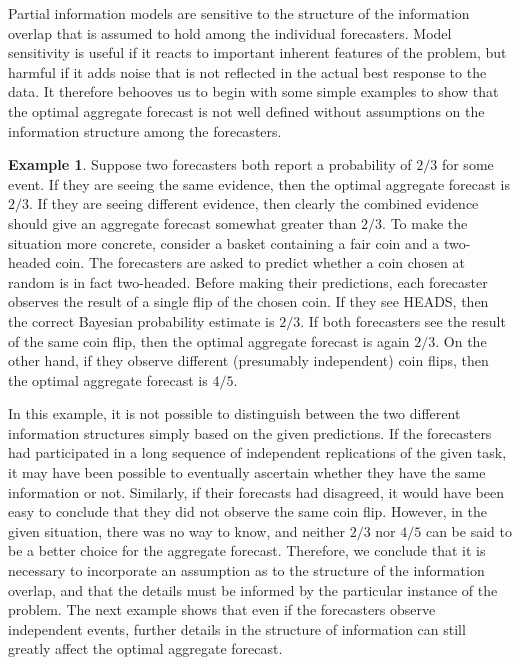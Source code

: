 \documentclass[11pt]{article}
\theoremstyle{definition}
\newtheorem{example}[theorem]{Example}
\theoremstyle{definition}
\begin{document}
Partial information models are sensitive to the structure of the
information overlap that is assumed to hold among the individual
forecasters. Model sensitivity is useful if it reacts
to important inherent features of the problem, but harmful if it adds
noise that is not reflected in the actual best response to the data.
It therefore behooves us to begin with some simple examples to show
that the optimal aggregate forecast is not well defined without
assumptions on the information structure among the forecasters.

\begin{example}
\label{FirstExample}
Suppose two forecasters both report a probability of $2/3$ for some
event.  If they are seeing the same evidence, then the optimal aggregate
forecast is $2/3$.  If they are seeing different evidence,
then clearly the combined evidence should give an aggregate forecast
somewhat greater than $2/3$.  To make the situation more concrete, consider a basket containing a fair coin and a two-headed coin. The forecasters are asked to predict whether a coin chosen at random is in fact
two-headed. Before making their predictions, each forecaster observes the result of a single flip of
the chosen coin.  If they see HEADS, then the correct
Bayesian probability estimate is $2/3$.  If both forecasters see the
result of the same coin flip, then the optimal aggregate forecast
 is again $2/3$. On the other hand, if they observe different (presumably
independent) coin flips, then the optimal aggregate forecast 
is $4/5$.
\end{example}
In this example, it is not possible to distinguish between the two different information structures simply based on the given predictions. If the forecasters had participated in a long sequence of independent replications of the given task, it may have been possible to eventually ascertain whether they have the same information or not. Similarly, if their forecasts had disagreed, it would have been easy to conclude that they did not observe the same coin flip.  However, in the given situation, there
was no way to know, and neither $2/3$ nor $4/5$ can be said to be a
better choice for the aggregate forecast.  Therefore, we conclude that it is necessary to incorporate an assumption as to the structure of the information
overlap, and that the details must be informed by the particular
instance of the problem. The next example shows that even if the forecasters observe independent events, further details
in the structure of information can still greatly affect the
optimal aggregate forecast.
\end{document}
